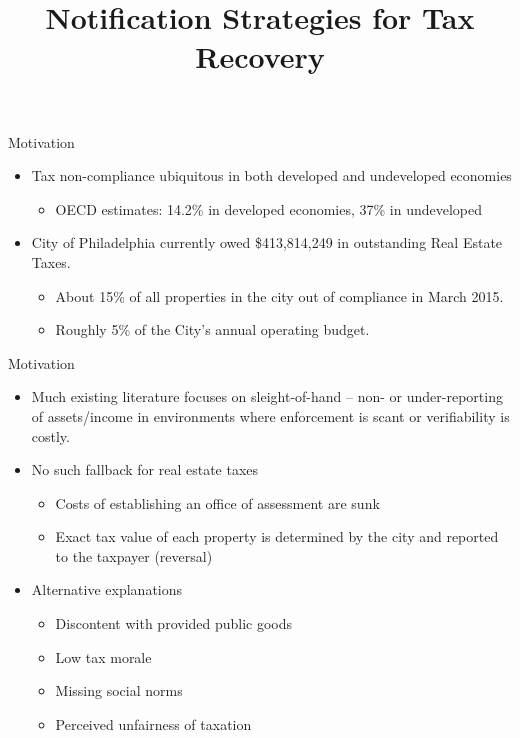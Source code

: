 \documentclass[ignorenonframetext,]{beamer}
\title{Notification Strategies for Tax Recovery}
\author{Michael Chirico\footnote<.->{The research presented here was supported
  in part by the Institute of Education Sciences, U.S. Department of
  Education, through Grant \#R305B090015 to the University of
  Pennsylvania. The opinions expressed are those of the presenter and do
  not represent the views of the Institute or the U.S. Department of
  Education.}, Robert Inman, Charles Loeffler, John MacDonald, Holger
Sieg}
\date{March 1, 2016

This Version: March 04, 2016 at 13:51}
\providecommand{\tightlist}{%
  \setlength{\itemsep}{0pt}\setlength{\parskip}{0pt}}
\begin{document}
\frame{\titlepage}

\begin{frame}{Motivation}

\begin{itemize}
\item
  Tax non-compliance ubiquitous in both developed and undeveloped
  economies

  \begin{itemize}
  \tightlist
  \item
    OECD estimates: 14.2\% in developed economies, 37\% in undeveloped
  \end{itemize}
\item
  City of Philadelphia currently owed \$413,814,249 in outstanding Real
  Estate Taxes.

  \begin{itemize}
  \item
    About 15\% of all properties in the city out of compliance in March
    2015.
  \item
    Roughly 5\% of the City's annual operating budget.
  \end{itemize}
\end{itemize}

\end{frame}

\begin{frame}{Motivation}

\begin{itemize}
\item
  Much existing literature focuses on sleight-of-hand -- non- or
  under-reporting of assets/income in environments where enforcement is
  scant or verifiability is costly.
\item
  No such fallback for real estate taxes

  \begin{itemize}
  \item
    Costs of establishing an office of assessment are sunk
  \item
    Exact tax value of each property is determined by the city and
    reported to the taxpayer (reversal)
  \end{itemize}
\item
  Alternative explanations

  \begin{itemize}
  \item
    Discontent with provided public goods
  \item
    Low tax morale
  \item
    Missing social norms
  \item
    Perceived unfairness of taxation
  \end{itemize}
\end{itemize}

\end{frame}
\end{document}
